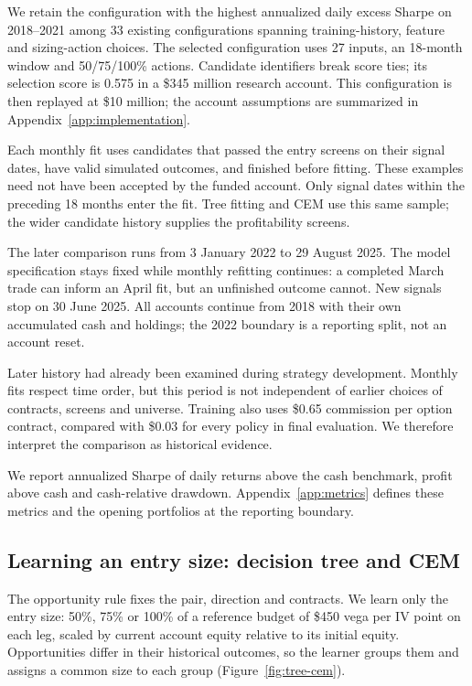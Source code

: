 \documentclass[11pt,letterpaper]{article}
\newcommand{\money}[1]{\$#1}
\begin{document}
We retain the configuration with the highest annualized daily excess Sharpe
on 2018--2021 among 33 existing configurations spanning training-history,
feature and sizing-action choices. The selected configuration uses 27 inputs,
an 18-month window and 50/75/100\% actions. Candidate identifiers break score ties; its selection score is 0.575 in a
\money{345 million} research account. This configuration is then replayed at
\money{10 million}; the account assumptions are summarized in
Appendix~\ref{app:implementation}.

Each monthly fit uses candidates that passed the entry screens on their signal
dates, have valid simulated outcomes, and finished before fitting. These
examples need not have been accepted by the funded account. Only signal dates
within the preceding 18 months enter the fit. Tree fitting and CEM use this
same sample; the wider candidate history supplies the profitability screens.

The later comparison runs from 3 January 2022 to 29 August 2025. The model
specification stays fixed while monthly refitting continues: a completed March
trade can inform an April fit, but an unfinished outcome cannot. New signals
stop on 30 June 2025. All accounts continue from 2018 with their own accumulated
cash and holdings; the 2022 boundary is a reporting split, not an account reset.

Later history had already been examined during strategy development. Monthly
fits respect time order, but this period is not independent of earlier choices
of contracts, screens and universe. Training also uses \money{0.65} commission
per option contract, compared with \money{0.03} for every policy in final
evaluation. We therefore interpret the comparison as historical evidence.

We report annualized Sharpe of daily returns above the cash benchmark, profit
above cash and cash-relative drawdown. Appendix~\ref{app:metrics} defines
these metrics and the opening portfolios at the reporting boundary.

\clearpage
\subsection{Learning an entry size: decision tree and CEM}
The opportunity rule fixes the pair, direction and contracts. We learn only
the entry size: 50\%, 75\% or 100\% of a reference budget of \money{450} vega
per IV point on each leg, scaled by current account equity relative to its
initial equity. Opportunities differ in their historical outcomes,
so the learner groups them and assigns a common size to each group
(Figure~\ref{fig:tree-cem}).
\end{document}
